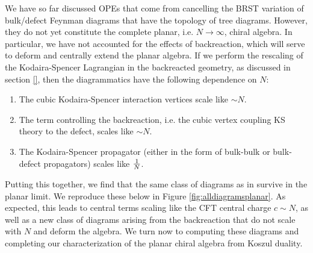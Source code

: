 \documentclass[../main.tex]{subfiles}
\begin{document}
We have so far discussed OPEs that come from cancelling the BRST variation of bulk/defect Feynman diagrams that have the topology of tree diagrams. However, they do not yet constitute the complete planar, i.e. $N \rightarrow \infty$, chiral algebra. In particular, we have not accounted for the effects of backreaction, which will serve to deform and centrally extend the planar algebra. If we perform the rescaling of the Kodaira-Spencer Lagrangian in the backreacted geometry, as discussed in section \ref{}, then the diagrammatics have the following dependence on $N$: 
\begin{enumerate}
\item The cubic Kodaira-Spencer interaction vertices scale like $\sim N$. \\
\item The term controlling the backreaction, i.e. the cubic vertex coupling KS theory to the defect, scales like $\sim N$. \\
\item The Kodaira-Spencer propagator (either in the form of bulk-bulk or bulk-defect propagators) scales like ${1 \over N}$.
\end{enumerate}

Putting this together, we find that the same class of diagrams as in \cite{CP} survive in the planar limit. We reproduce these below in Figure \ref{fig:alldiagramsplanar}. As expected, this leads to central terms scaling like the CFT central charge $c \sim N$, as well as a new class of diagrams arising from the backreaction that do not scale with $N$ and deform the algebra. We turn now to computing these diagrams and completing our characterization of the planar chiral algebra from Koszul duality. 
\end{document}
